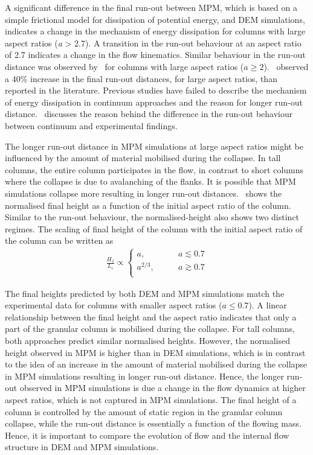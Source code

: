 A significant difference in the final run-out between MPM, which is based on a 
simple frictional model for dissipation of potential energy, and DEM 
simulations, indicates a change in the mechanism of energy 
dissipation for columns with large aspect ratios (\textit{a} > 
2.7). A transition in the run-out behaviour at an aspect ratio of 2.7 indicates 
a change in the flow kinematics. Similar behaviour in the run-out distance was 
observed by~\citet{Bandara2013} for columns with large aspect ratios ($a \ge 
2$).~\citet{Mast2014} observed a 40\% increase in the final run-out distances, 
for large aspect ratios, than reported in the literature. Previous studies have 
failed to describe the mechanism of energy dissipation in continuum approaches 
and the reason for longer run-out distance.~ discusses the 
reason behind the difference in the run-out behaviour between continuum and 
experimental findings.

The longer run-out distance in MPM simulations at large aspect ratios might be 
influenced by the amount of material mobilised during the collapse. In tall 
columns, the entire column participates in the flow, in contrast to short 
columns where the collapse is due to avalanching of the flanks. It is possible 
that MPM simulations collapse more resulting in longer run-out 
distances.~ shows the normalised final height as a function of 
the initial aspect ratio of the column. Similar to the run-out behaviour, the 
normalised-height also shows two distinct regimes. The scaling of final height 
of the column with the initial aspect ratio of the column can be written as
\begin{align}
\frac{H_{{f}}}{L_{{i}}} \propto  
\begin{cases}
\textit{a}, \qquad & \textit{a}\lesssim0.7 \\
\textit{a}^{2/3}, \qquad & \textit{a}\gtrsim0.7 \\
\end{cases}
\end{align} 

The final heights predicted by both DEM and MPM simulations match the 
experimental data for columns with smaller aspect ratios ($a \le 0.7$). A 
linear relationship between the final height and the aspect ratio indicates 
that only a part of the granular column is mobilised during the collapse. For 
tall columns, both approaches predict similar normalised heights. However, the 
normalised height observed in MPM is higher than in DEM simulations, which is 
in contrast to the idea of an increase in the amount of material mobilised 
during the collapse in MPM simulations resulting in longer run-out distance. 
Hence, the longer run-out observed in MPM simulations is due a change in the 
flow dynamics at higher aspect ratios, which is not captured in MPM 
simulations. The final height of a column is controlled by the amount of static 
region in the granular column collapse, while the run-out distance is 
essentially a function of the flowing mass. Hence, it is important to compare 
the evolution of flow and the internal flow structure in DEM and MPM 
simulations.

